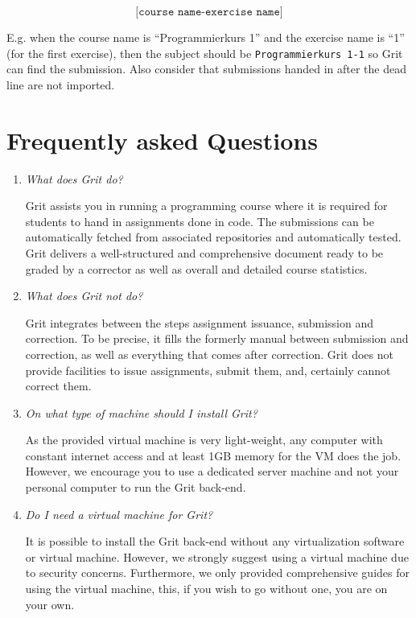 \documentclass[10pt,a4paper, titlepage, toc=idx]{scrreprt}
\theoremstyle{definition}
\theoremstyle{plain}
\newcommand*{\product}{Grit}
\begin{document}
       \[ \texttt{[course name-exercise name]} \]

       E.g. when the course name is ``Programmierkurs 1'' and the
       exercise name is ``1'' (for the first exercise), then the
       subject should be \texttt{Programmierkurs 1-1} so \product{} can
       find the submission. Also consider that submissions handed in
       after the dead line are not imported.
       
	\chapter{Frequently asked Questions}
	\begin{enumerate}
        \item \textit{What does \product{} do?}
		
          \product{}  assists you in running a programming course where
          it is required for students to hand in assignments done in
          code. The submissions can be automatically fetched from
          associated repositories and automatically tested. \product{} 
          delivers a well-structured and comprehensive document ready
          to be graded by a corrector as well as overall and detailed
          course statistics.
		
        \item \textit{What does \product{} not do?}
		
          \product{}  integrates between the steps assignment issuance,
          submission and correction. To be precise, it fills the
          formerly manual between submission and correction, as well
          as everything that comes after correction. \product{} does not
          provide facilities to issue assignments, submit them, and,
          certainly cannot correct them.
		
        \item \textit{On what type of machine should I install
            \product?}
		
          As the provided virtual machine is very light-weight, any
          computer with constant internet access and at least 1GB
          memory for the VM does the job. However, we encourage you to
          use a dedicated server machine and not your personal
          computer to run the \product{} back-end.
		
        \item \textit{Do I need a virtual machine for \product?}
		
          It is possible to install the \product{} back-end without any
          virtualization software or virtual machine. However, we
          strongly suggest using a virtual machine due to security
          concerns. Furthermore, we only provided comprehensive guides
          for using the virtual machine, this, if you wish to go
          without one, you are on your own.
		

\end{enumerate}
\end{document}
